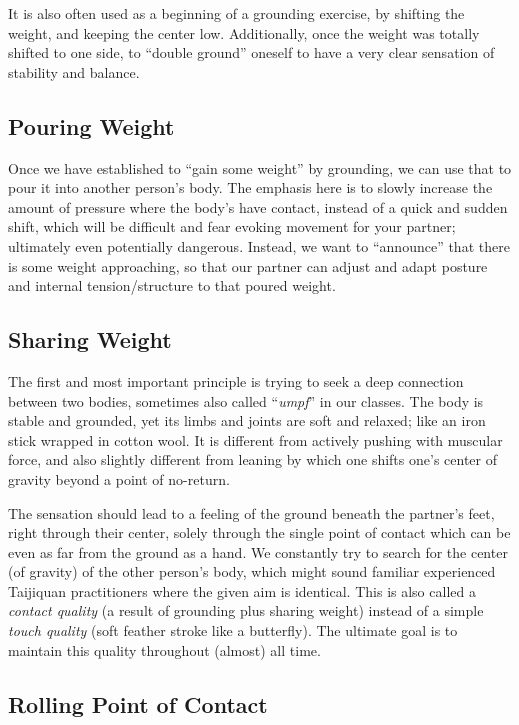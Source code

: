 It is also often used as a beginning of a grounding exercise, by shifting the weight, and keeping the center low.
Additionally, once the weight was totally shifted to one side, to ``double ground'' oneself to have a very clear sensation of stability and balance.

\subsection{Pouring Weight}\label{subsec:pouring-weight}

Once we have established to ``gain some weight'' by grounding, we can use that to pour it into another person's body.
The emphasis here is to slowly increase the amount of pressure where the body's have contact, instead of a quick and sudden shift, which will be difficult and fear evoking movement for your partner; ultimately even potentially dangerous.
Instead, we want to ``announce'' that there is some weight approaching, so that our partner can adjust and adapt posture and internal tension/structure to that poured weight.

\subsection{Sharing Weight}\label{subsec:sharing-weight}

The first and most important principle is trying to seek a deep connection between two bodies, sometimes also called ``\textit{umpf}'' in our classes.
The body is stable and grounded, yet its limbs and joints are soft and relaxed; like an iron stick wrapped in cotton wool.
It is different from actively pushing with muscular force, and also slightly different from leaning by which one shifts one's center of gravity beyond a point of no-return.

The sensation should lead to a feeling of the ground beneath the partner's feet, right through their center, solely through the single point of contact which can be even as far from the ground as a hand.
We constantly try to search for the center (of gravity) of the other person's body, which might sound familiar experienced Taijiquan practitioners where the given aim is identical.
This is also called a \textit{contact quality} (a result of grounding plus sharing weight) instead of a simple \textit{touch quality} (soft feather stroke like a butterfly).
The ultimate goal is to maintain this quality throughout (almost)  all time.

\subsection{Rolling Point of Contact}\label{subsec:rolling-point-of-contact}

